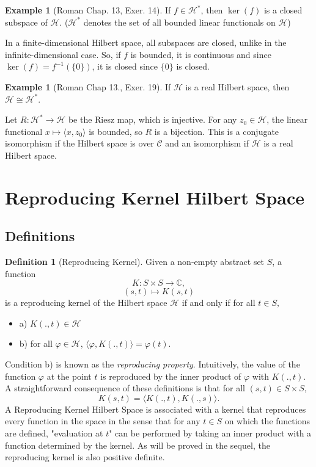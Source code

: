 \documentclass{article}
\theoremstyle{definition}
\newtheorem{exmp}[thm]{Example}
\newtheorem{defn}[thm]{Definition}
\theoremstyle{remark}
\numberwithin{equation}{section}
\begin{document}
\begin{exmp} [Roman Chap. 13, Exer. 14] If $f \in \mathcal{H}^*$, then $\ker (f)$ is a closed subspace of $\mathcal{H}$. ($\mathcal{H}^*$ denotes the set of all bounded linear functionals on $\mathcal{H}$)

In a finite-dimensional Hilbert space, all subspaces are closed, unlike in the infinite-dimensional case. So, if $f$ is bounded, it is continuous and since $\ker (f) = f^{-1} (\{ 0 \} )$, it is closed since $\{ 0 \}$ is closed. 

\end{exmp}

\begin{exmp} [Roman Chap 13., Exer. 19]If $\mathcal{H}$ is a real Hilbert space, then $\mathcal{H} \cong \mathcal{H}^*$. 

Let $R: \mathcal{H} ^* \rightarrow \mathcal{H}$ be the Riesz map, which is injective. For any $z_0 \in \mathcal{H}$, the linear functional $x \mapsto \langle x, z_0 \rangle$ is bounded, so $R$ is a bijection. This is a conjugate isomorphism if the Hilbert space is over $\mathcal{C}$ and an isomorphism if $\mathcal{H}$ is a real Hilbert space. 
\end{exmp}

\section{Reproducing Kernel Hilbert Space}
\subsection{Definitions}
\begin{defn}[Reproducing Kernel]
Given a non-empty abstract set $S$, a function 
$$K : S \times S \rightarrow \mathbb{C},$$
$$(s, t) \mapsto K(s,t) $$
is a reproducing kernel of the Hilbert space $\mathcal{H}$ if and only if for all $t \in S,$
\begin{itemize}
    \item a) $K(. ,t) \in \mathcal{H}$
    \item b) for all $\varphi \in \mathcal{H}$, $\langle \varphi , K(. , t) \rangle = \varphi (t).$ 
\end{itemize}
Condition b) is known as the \textit{reproducing property}. Intuitively, the value of the function $\varphi$ at the point $t$ is reproduced by the inner product of $\varphi$ with $K(. , t)$. A straightforward consequence of these definitions is that for all $(s,t) \in S \times S,$ 
$$K(s, t) = \langle K(., t), K(., s) \rangle.$$
A Reproducing Kernel Hilbert Space is associated with a kernel that reproduces every function in the space in the sense that for any $t \in S$ on which the functions are defined, "evaluation at $t$" can be performed by taking an inner product with a function determined by the kernel. As will be proved in the sequel, the reproducing kernel is also positive definite. 
\end{defn}
\end{document}

